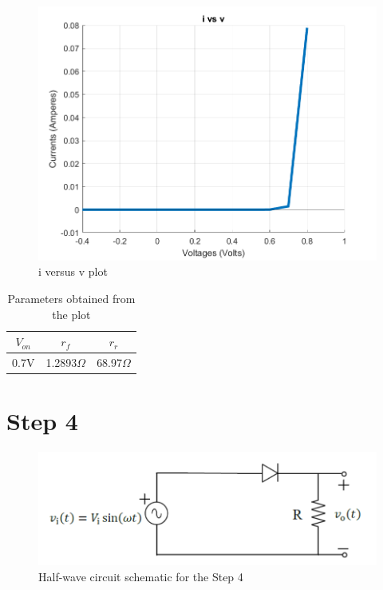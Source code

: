 \documentclass[letterpaper,12pt]{article}
\begin{document}
\begin{figure}[H]
    \centering
    \includegraphics[width=1\textwidth]{3b.png}
    \caption{i versus v plot}
\end{figure} 
\begin{table}[H]
    \begin{center}
    \caption{ Parameters obtained from the plot}
    \vspace{2mm}
    \begin{tabular}{||c | c | c ||} 
    \hline
    \(V_{on}\) &  \(r_f\) & \(r_r\)\\ [0.5ex] 
    \hline\hline
    0.7V & 1.2893\(\Omega\)  & 68.97\(\Omega\)   \\ 
    
\hline
\end{tabular}
\end{center}
\end{table}

\section{Step 4}


\begin{figure}[H]
    \centering
   \includegraphics[width=1\textwidth]{4_1.png}
   \caption{Half-wave circuit schematic for the Step 4}
\end{figure} 
\end{document}
